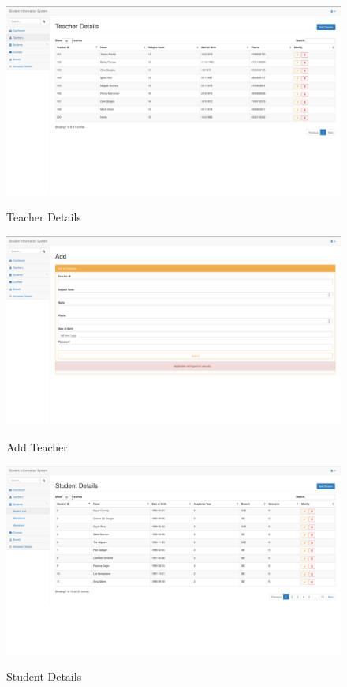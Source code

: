 \begin{figure}[H]
\centering
\caption{Teacher Details}
\includegraphics[width=\textwidth,height=\textheight,keepaspectratio]{./snaps/3.png}
\\[0.2in]

\end{figure}

\begin{figure}[H]
\centering
\caption{Add Teacher}
\includegraphics[width=\textwidth,height=\textheight,keepaspectratio]{./snaps/4.png}
\\[0.2in]

\end{figure}

\begin{figure}[H]
\centering
\caption{Student Details}
\includegraphics[width=\textwidth,height=\textheight,keepaspectratio]{./snaps/5.png}
\\[0.2in]

\end{figure}

